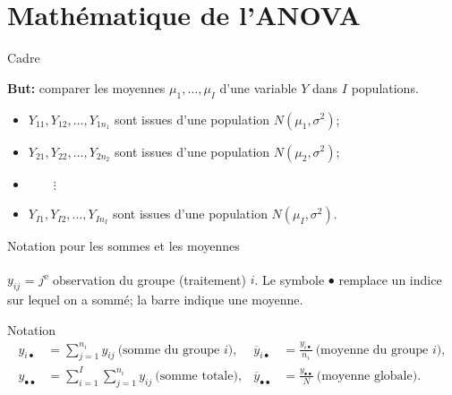 \documentclass{BeamerTemplate}
\begin{document}
\section{Mathématique de l'ANOVA}

\begin{frame}[t]{Cadre}

\textbf{But:} comparer les moyennes $\mu_1,\ldots,\mu_I$ d'une variable $Y$
dans $I$ populations.

\bigskip

\begin{itemize}\itemsep2mm
  \item $Y_{11}, Y_{12}, \ldots, Y_{1n_1}$ sont issues d'une population $N(\mu_1,\sigma^2)$;
  \item $Y_{21}, Y_{22}, \ldots, Y_{2n_2}$ sont issues d'une population $N(\mu_2,\sigma^2)$;
  \item[] $\qquad\vdots$
  \item $Y_{I1}, Y_{I2}, \ldots, Y_{In_I}$ sont issues d'une population $N(\mu_I,\sigma^2)$.
\end{itemize}

\bigskip
{}

\end{frame}

\begin{frame}[t]{Notation pour les sommes et les moyennes}

\small
$y_{ij}$ = $j$\textsuperscript{e} observation du groupe (traitement) $i$.
Le symbole $\bullet$ remplace un indice sur lequel on a \alert{sommé};
la barre indique une \alert{moyenne}.

\begin{Boite}{Notation}
\vspace{-2mm}
\begin{align*}
y_{i\bullet} &= \sum_{j=1}^{n_i} y_{ij} \ \text{(somme du groupe $i$)},
&
\overline{y}_{i\bullet} &= \frac{y_{i\bullet}}{n_i} \ \text{(moyenne du groupe $i$)},\\
y_{\bullet\bullet} &= \sum_{i=1}^{I}\sum_{j=1}^{n_i} y_{ij} \ \text{(somme totale)},
&
\overline{y}_{\bullet\bullet} &= \frac{y_{\bullet\bullet}}{N} \ \text{(moyenne globale)}.
\end{align*}
\end{Boite}


\end{frame}
\end{document}
